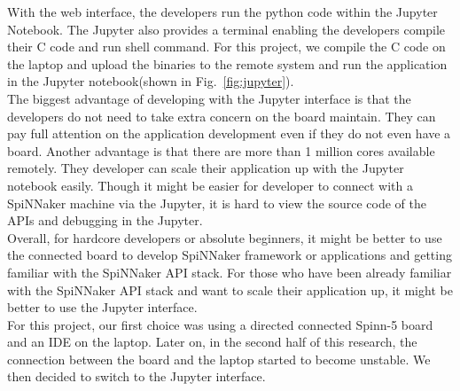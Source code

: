 With the web interface, the developers run the python code within the Jupyter Notebook. The Jupyter also provides a terminal enabling the developers compile their C code and run shell command. For this project, we compile the C code on the laptop and upload the binaries to the remote system and run the application in the Jupyter notebook(shown in Fig.~\ref{fig:jupyter}).\\

The biggest advantage of developing with the Jupyter interface is that the developers do not need to take extra concern on the board maintain. They can pay full attention on the application development even if they do not even have a board. Another advantage is that there are more than 1 million cores available remotely. They developer can scale their application up with the Jupyter notebook easily. Though it might be easier for developer to connect with a SpiNNaker machine via the Jupyter, it is hard to view the source code of the APIs and debugging in the Jupyter. \\

Overall, for hardcore developers or absolute beginners, it might be better to use the connected board to develop SpiNNaker framework or applications and getting familiar with the SpiNNaker API stack. For those who have been already familiar with the SpiNNaker API stack and want to scale their application up, it might be better to use the Jupyter interface.\\

For this project, our first choice was using a directed connected Spinn-5 board and an IDE on the laptop. Later on, in the second half of this research, the connection between the board and the laptop started to become unstable. We then decided to switch to the Jupyter interface.\\

